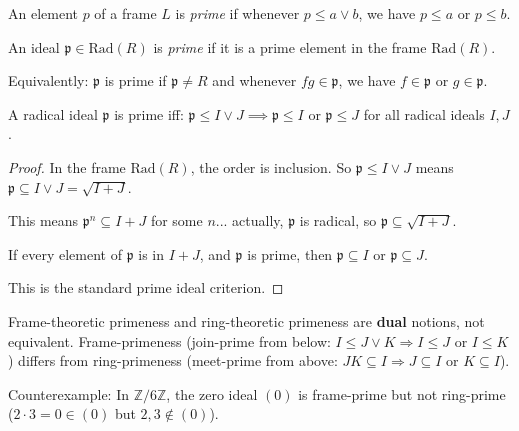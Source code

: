 \begin{definition}
  \label{def:prime-frame-element}
  \leanok
  An element $p$ of a frame $L$ is \emph{prime} if whenever $p \leq a \lor b$, we have $p \leq a$ or $p \leq b$.
\end{definition}

\begin{definition}
  \label{def:prime-ideal}
  \leanok
  An ideal $\mathfrak{p} \in \mathrm{Rad}(R)$ is \emph{prime} if it is a prime element in the frame $\mathrm{Rad}(R)$.
  
  Equivalently: $\mathfrak{p}$ is prime if $\mathfrak{p} \neq R$ and whenever $fg \in \mathfrak{p}$, we have $f \in \mathfrak{p}$ or $g \in \mathfrak{p}$.
\end{definition}

\begin{lemma}
  \label{lemma:prime-frame-criterion}
  \leanok
  A radical ideal $\mathfrak{p}$ is prime iff: $\mathfrak{p} \leq I \lor J \implies \mathfrak{p} \leq I \text{ or } \mathfrak{p} \leq J$ 
  for all radical ideals $I, J$.
\end{lemma}

\begin{proof}
  \leanok
  In the frame $\mathrm{Rad}(R)$, the order is inclusion. So $\mathfrak{p} \leq I \lor J$ means $\mathfrak{p} \subseteq I \lor J = \sqrt{I + J}$.

  This means $\mathfrak{p}^n \subseteq I + J$ for some $n$... actually, $\mathfrak{p}$ is radical, so $\mathfrak{p} \subseteq \sqrt{I + J}$.

  If every element of $\mathfrak{p}$ is in $I + J$, and $\mathfrak{p}$ is prime, then $\mathfrak{p} \subseteq I$ or $\mathfrak{p} \subseteq J$.

  This is the standard prime ideal criterion.
\end{proof}

\begin{theorem}
  \label{thm:prime-ideals-specialization}
  \leanok
  Frame-theoretic primeness and ring-theoretic primeness are \textbf{dual} notions, not equivalent.
  Frame-primeness (join-prime from below: $I \leq J \vee K \Rightarrow I \leq J$ or $I \leq K$) differs from
  ring-primeness (meet-prime from above: $JK \subseteq I \Rightarrow J \subseteq I$ or $K \subseteq I$).

  Counterexample: In $\mathbb{Z}/6\mathbb{Z}$, the zero ideal $(0)$ is frame-prime but not ring-prime
  ($2 \cdot 3 = 0 \in (0)$ but $2, 3 \notin (0)$).
\end{theorem}

